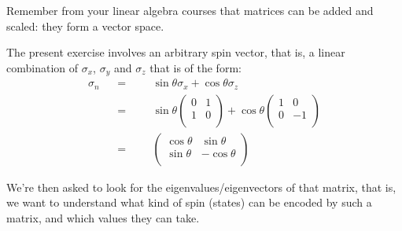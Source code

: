 \documentclass[solutions.tex]{subfiles}
\begin{document}
\begin{remark} Remember from your linear algebra courses that
matrices can be added and scaled: they form a vector space.
\end{remark}

The present exercise involves an arbitrary spin vector, that is, a
linear combination of $\sigma_x$, $\sigma_y$ and $\sigma_z$ that is of the form:
\begin{equation*}\begin{aligned}
	\sigma_n &&=&&& \sin\theta\sigma_x + \cos\theta\sigma_z \\
	~        &&=&&& \sin\theta\begin{pmatrix}
		0 & 1 \\
		1 & 0 \\
	\end{pmatrix} + \cos\theta\begin{pmatrix}
		1 & 0 \\
		0 & -1 \\
	\end{pmatrix} \\
	~        &&=&&& \begin{pmatrix}
		\cos\theta & \sin\theta \\
		\sin\theta & -\cos\theta \\
	\end{pmatrix}
\end{aligned}\end{equation*}

We're then asked to look for the eigenvalues/eigenvectors of that matrix,
that is, we want to understand what kind of spin (states) can be encoded
by such a matrix, and which values they can take.

\hrr
\end{document}
